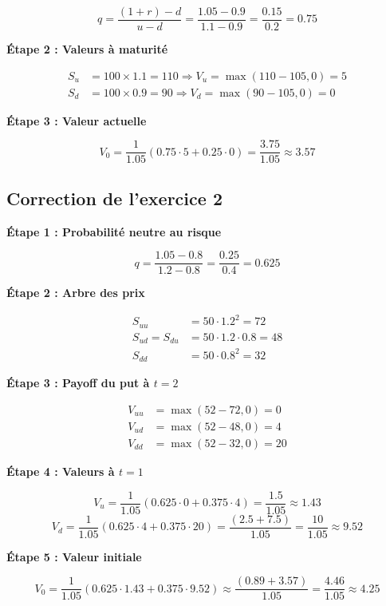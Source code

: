 \documentclass[12pt,a4paper]{article}
\begin{document}
\[
q = \frac{(1 + r) - d}{u - d} = \frac{1.05 - 0.9}{1.1 - 0.9} = \frac{0.15}{0.2} = 0.75
\]

\textbf{Étape 2 : Valeurs à maturité}

\[
\begin{aligned}
S_u &= 100 \times 1.1 = 110 \Rightarrow V_u = \max(110 - 105, 0) = 5 \\
S_d &= 100 \times 0.9 = 90 \Rightarrow V_d = \max(90 - 105, 0) = 0
\end{aligned}
\]

\textbf{Étape 3 : Valeur actuelle}

\[
V_0 = \frac{1}{1.05} \left(0.75 \cdot 5 + 0.25 \cdot 0\right) = \frac{3.75}{1.05} \approx \boxed{3.57}
\]

\vspace{0.5cm}

\subsection*{Correction de l’exercice 2}

\textbf{Étape 1 : Probabilité neutre au risque}

\[
q = \frac{1.05 - 0.8}{1.2 - 0.8} = \frac{0.25}{0.4} = 0.625
\]

\textbf{Étape 2 : Arbre des prix}

\[
\begin{aligned}
S_{uu} &= 50 \cdot 1.2^2 = 72 \\
S_{ud} = S_{du} &= 50 \cdot 1.2 \cdot 0.8 = 48 \\
S_{dd} &= 50 \cdot 0.8^2 = 32
\end{aligned}
\]

\textbf{Étape 3 : Payoff du put à $t=2$}

\[
\begin{aligned}
V_{uu} &= \max(52 - 72, 0) = 0 \\
V_{ud} &= \max(52 - 48, 0) = 4 \\
V_{dd} &= \max(52 - 32, 0) = 20
\end{aligned}
\]

\textbf{Étape 4 : Valeurs à $t=1$}

\[
V_u = \frac{1}{1.05} \left(0.625 \cdot 0 + 0.375 \cdot 4\right) = \frac{1.5}{1.05} \approx 1.43
\]
\[
V_d = \frac{1}{1.05} \left(0.625 \cdot 4 + 0.375 \cdot 20\right) = \frac{(2.5 + 7.5)}{1.05} = \frac{10}{1.05} \approx 9.52
\]

\textbf{Étape 5 : Valeur initiale}

\[
V_0 = \frac{1}{1.05} \left(0.625 \cdot 1.43 + 0.375 \cdot 9.52\right) \approx \frac{(0.89 + 3.57)}{1.05} = \frac{4.46}{1.05} \approx \boxed{4.25}
\]
\end{document}
